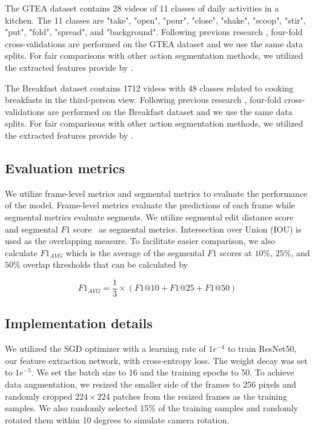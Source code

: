 \documentclass[sn-mathphys,Numbered]{sn-jnl}
\theoremstyle{thmstyleone}\newtheorem{theorem}{Theorem}\newtheorem{proposition}[theorem]{Proposition}
\theoremstyle{thmstyletwo}\newtheorem{example}{Example}\newtheorem{remark}{Remark}
\theoremstyle{thmstylethree}\newtheorem{definition}{Definition}
\begin{document}
The GTEA dataset \cite{fathi2011learning} contains 28 videos of 11 classes of daily activities in a kitchen. The 11 classes are "take", "open", "pour", "close", "shake", "scoop", "stir", "put", "fold", "spread", and "background". Following previous research \cite{farha2019ms,li2020ms,yi2021asformer,wang2022cross,park2022maximization,liu2023diffusion}, four-fold cross-validations are performed on the GTEA dataset and we use the same data splits. For fair comparisons with other action segmentation methods, we utilized the extracted features provide by \cite{farha2019ms}.

The Breakfast dataset \cite{kuehne2014language} contains 1712 videos with 48 classes related to cooking breakfasts in the third-person view. Following previous research \cite{farha2019ms,li2020ms,yi2021asformer,wang2022cross,park2022maximization,liu2023diffusion}, four-fold cross-validations are performed on the Breakfast dataset and we use the same data splits. For fair comparisons with other action segmentation methods, we utilized the extracted features provide by \cite{farha2019ms}.

\subsection{Evaluation metrics}
We utilize frame-level metrics \cite{twinanda2016endonet,wang2022less,funke2023metrics} and segmental metrics \cite{zhang2021swnet} to evaluate the performance of the model. Frame-level metrics evaluate the predictions of each frame while segmental metrics evaluate segments. We utilize segmental edit distance score~\cite{lea2016learning} and segmental $F1$ score~\cite{lea2017temporal} as segmental metrics. Intersection over Union (IOU) is used as the overlapping measure. To facilitate easier comparison, we also calculate $F1_{AVG}$ \cite{zhang2022surgicala} which is the average of the segmental $F1$ scores at $10\%$, $25\%$, and $50\%$ overlap thresholds that can be calculated by

\begin{equation}
    F1_{AVG}=\dfrac{1}{3} \times ({F1@10 + F1@25 + F1@50}) 
\end{equation}

\subsection{Implementation details}
We utilized the SGD optimizer with a learning rate of $1e^{-4}$ to train ResNet50, our feature extraction network, with cross-entropy loss. The weight decay was set to $1e^{-5}$. We set the batch size to 16 and the training epochs to 50. To achieve data augmentation, we resized the smaller side of the frames to 256 pixels and randomly cropped $224\times 224$ patches from the resized frames as the training samples. We also randomly selected 15\% of the training samples and randomly rotated them within 10 degrees to simulate camera rotation. 
\end{document}

